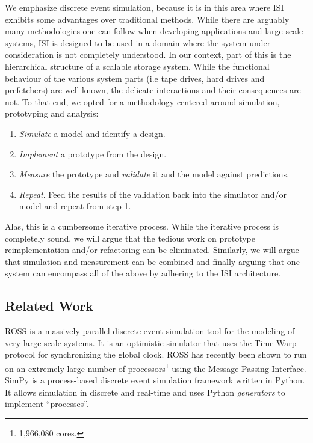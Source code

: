 We emphasize discrete event simulation, because it is in this area where ISI
exhibits some advantages over traditional methods. While there are arguably
many methodologies one can follow when developing applications and large-scale
systems, ISI is designed to be used in a domain where the system under
consideration is not completely understood. In our context, part of this is the
hierarchical structure of a scalable storage system. While the functional
behaviour of the various system parts (i.e tape drives, hard drives and
prefetchers) are well-known, the delicate interactions and their consequences
are not. To that end, we opted for a methodology centered around simulation,
prototyping and analysis:

\begin{enumerate}
	\item \emph{Simulate} a model and identify a design.
	\item \emph{Implement} a prototype from the design.
	\item \emph{Measure} the prototype and \emph{validate} it and the model
		against predictions.
	\item \emph{Repeat}. Feed the results of the validation back into the
		simulator and/or model and repeat from step 1.
\end{enumerate}

Alas, this is a cumbersome iterative process. While the iterative process is
completely sound, we will argue that the tedious work on prototype
reimplementation and/or refactoring can be eliminated. Similarly, we will argue
that simulation and measurement can be combined and finally arguing that one
system can encompass all of the above by adhering to the ISI architecture.

\subsection{Related Work}
ROSS\cite{ross} is a massively parallel discrete-event simulation tool for the
modeling of very large scale systems. It is an optimistic simulator that uses
the Time Warp\cite{timewarp} protocol for synchronizing the global clock. ROSS
has recently\cite{ross-warpspeed} been shown to run on an extremely large number of
processors\footnote{1,966,080 cores.} using the Message
Passing Interface\cite{mpi}. SimPy\cite{simpy} is a process-based discrete
event simulation framework written
in Python. It allows simulation in discrete and real-time and uses Python
\emph{generators} to implement ``processes''.

